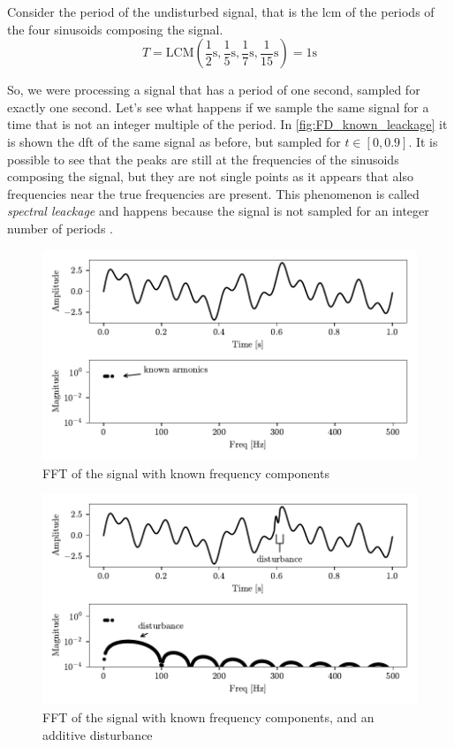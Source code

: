Consider the period of the undisturbed signal, that is the \gls{lcm} of the periods of the four sinusoids composing the signal.
\[ 
    T = \text{LCM} \left( \frac{1}{2} \si{\s},\frac{1}{5}\si{\s},\frac{1}{7}\si{\s},\frac{1}{15}\si{\s} \right) = 1 \si{\s}
\]

So, we were processing a signal that has a period of one second, sampled for exactly one second. Let's see what happens if we sample the same signal for a time that is not an integer multiple of the period. In \autoref{fig:FD_known_leackage} it is shown the \gls{dft} of the same signal as before, but sampled for $t \in [0, 0.9]$. It is possible to see that the peaks are still at the frequencies of the sinusoids composing the signal, but they are not single points as it appears that also frequencies near the true frequencies are present. This phenomenon is called \emph{spectral leackage} and happens because the signal is not sampled for an integer number of periods \cite{SpectralLeakage}. 


\begin{figure}
    \centering
    \includegraphics[scale=1]{images/FeatureExtraction/FD_known.pdf}
    \caption{FFT of the signal with known frequency components}
    \label{fig:FD_known}
\end{figure}

\begin{figure}
    \centering
    \includegraphics[scale=1]{images/FeatureExtraction/FD_known_dist.pdf}
    \caption{FFT of the signal with known frequency components, and an additive disturbance}
    \label{fig:FD_known_dist}
\end{figure}

